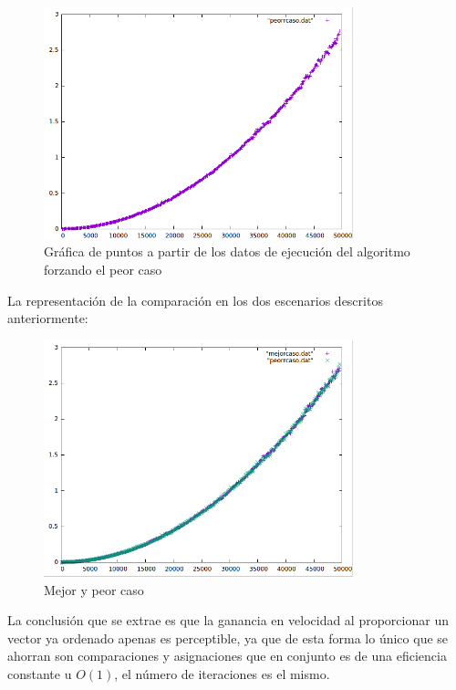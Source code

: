 \documentclass[paper=a4, fontsize=10pt]{scrartcl} %
\begin{document}
\begin{figure}[H] %
	\centering
	\label{lsblk}
	\includegraphics[width=0.8\textwidth]{../imgs/ejercicio4c.PNG}
	\caption{Gráfica de puntos a partir de los datos de ejecución del algoritmo forzando el peor caso} 
\end{figure}

La representación de la comparación en los dos escenarios descritos anteriormente:

\begin{figure}[H] %
	\centering
	\label{lsblk}
	\includegraphics[width=0.8\textwidth]{../imgs/ejercicio4b.PNG}
	\caption{Mejor y peor caso} 
\end{figure}

La conclusión que se extrae es que la ganancia en velocidad al proporcionar un vector ya ordenado apenas es perceptible, ya que de esta forma lo único que se ahorran son comparaciones y asignaciones que en conjunto es de una eficiencia constante u $O(1)$, el número de iteraciones es el mismo. 
\end{document}
